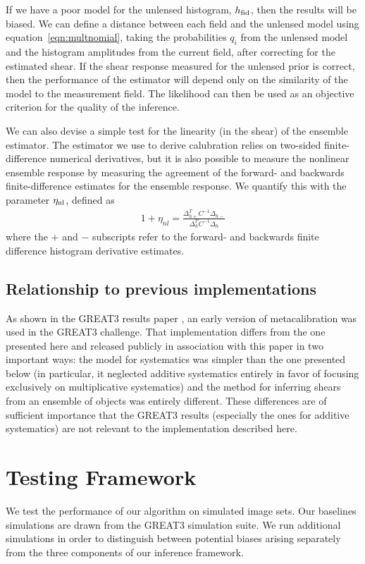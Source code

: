 \documentclass[iop]{emulateapj}
\begin{document}
If we have a poor model for the unlensed histogram, $h_{\rm fid}$,
then the results will be biased. We can define a distance between each
field and the unlensed model using equation~\ref{eqn:multnomial},
taking the probabilities $q_i$ from the unlensed model and the
histogram amplitudes from the current field, after correcting for the
estimated shear. If the shear response measured for the unlensed prior
is correct, then the performance of the estimator will depend only on
the similarity of the model to the measurement field. The likelihood
can then be used as an objective criterion for the quality of the
inference.

We can also devise a simple test for the linearity (in the shear) of
the ensemble estimator. The estimator we use to derive calubration
relies on two-sided finite-difference numerical derivatives, but it is
also possible to measure the nonlinear ensemble response by measuring
the agreement of the forward- and backwards finite-difference
estimates for the ensemble response. We quantify this with the parameter $\eta_{\rm
  nl}$, defined as 
\begin{align}
1+\eta_{nl} = \frac{\Delta_{h+}^T C^{-1} \Delta_{h-}}{\Delta_{h}^TC^{-1}\Delta_{h}}
\end{align}
where the $+$ and $-$ subscripts refer to the forward- and backwards
finite difference histogram derivative estimates.

\subsection{Relationship to previous implementations}

As shown in the GREAT3 results paper \citep{2015MNRAS.450.2963M}, an
early version of metacalibration was used in the GREAT3 challenge.
That implementation differs from the one presented here and released
publicly in association with this paper in two important ways: the
model for systematics was simpler than the one presented below (in
particular, it neglected additive systematics entirely in favor of
focusing exclusively on multiplicative systematics) and the method for
inferring shears from an ensemble of objects was entirely different.
These differences are of sufficient importance that the GREAT3 results
(especially the ones for additive systematics) are not relevant to the
implementation described here.


\section{Testing Framework}
We test the performance of our algorithm on simulated image sets. Our
baselines simulations are drawn from the GREAT3 simulation suite. We
run additional simulations in order to distinguish between potential
biases arising separately from the three components of our inference
framework.
\end{document}
